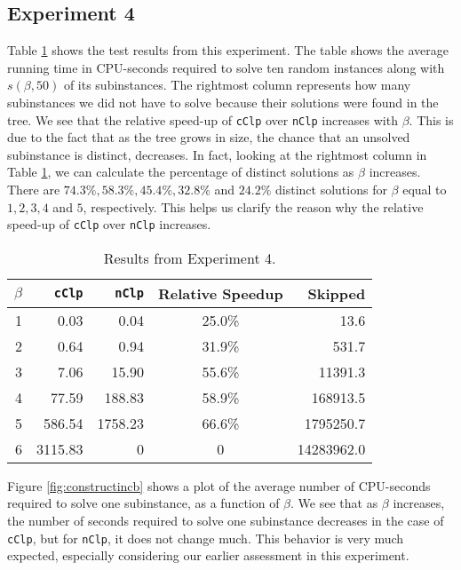 \subsection*{Experiment 4}
Table \ref{table:exptwo} shows the test results from this experiment.
The table shows the average running time in CPU-seconds required to solve
ten random instances along with $s(\beta, 50)$ of its subinstances.
The rightmost column represents how many subinstances we did not have to
solve because their solutions were found in the tree.
We see that the relative speed-up of \texttt{cClp} over \texttt{nClp}
increases with $\beta$.
This is due to the fact that as the tree grows in size, the chance that
an unsolved subinstance is distinct, decreases. In fact, looking at the
rightmost column in Table \ref{table:exptwo}, we can calculate the percentage
of distinct solutions as $\beta$ increases.
There are $74.3\%, 58.3\%, 45.4\%, 32.8\%$ and $24.2\%$ distinct solutions for
$\beta$ equal to $1,2,3,4$ and $5$, respectively. This helps us clarify the reason
why the relative speed-up of \texttt{cClp} over \texttt{nClp} increases.
\begin{table}[ht!]
\centering
\caption{Results from Experiment 4.}
\begin{tabular}{rrrcr}
      $\beta$ & \texttt{cClp} & \texttt{nClp} & Relative Speedup & Skipped\\ \hline
       1  & 0.03 & 0.04 & 25.0\% & 13.6 \\
       2  & 0.64 & 0.94 & 31.9\% & 531.7 \\
       3  & 7.06 & 15.90 & 55.6\% & 11391.3 \\
       4  & 77.59 & 188.83 & 58.9\% & 168913.5 \\
       5  & 586.54 & 1758.23 & 66.6\% & 1795250.7 \\
       6  & 3115.83 & 0      & 0      & 14283962.0
\end{tabular}
\label{table:exptwo}
\end{table}

Figure \ref{fig:constructincb} shows a plot of the average number of
CPU-seconds required to solve one subinstance, as a function of $\beta$.
We see that as $\beta$ increases, the number of seconds required to solve
one subinstance decreases in the case of \texttt{cClp},
but for \texttt{nClp}, it does not change much. This behavior is very
much expected, especially considering our earlier assessment in this
experiment.

